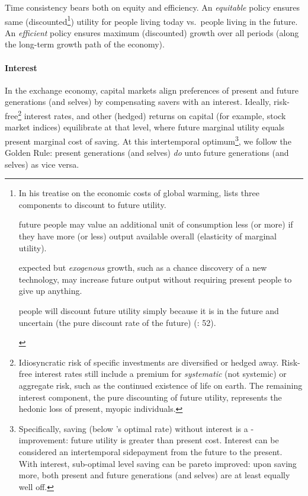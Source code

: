 Time consistency bears both on equity and efficiency. An \emph{equitable} policy ensures same (discounted\footnote{
	\label{fn:3components}In his treatise on the economic costs of global warming, \citeauthor{Stern-2006-aa} lists three components to discount to future utility. \begin{inparaenum}[\itshape 1\upshape)]
		\item future people may value an additional unit of consumption less (or more) if they have more (or less) output available overall (elasticity of marginal utility).
		\item expected but \emph{exogenous} growth, such as a chance discovery of a new technology, may increase future output without requiring present people to give up anything.
		\item people will discount future utility simply because it is in the future and uncertain (the pure discount rate of the future) (\citeyear{Stern-2006-aa}: 52).
	\end{inparaenum}})
utility for people living today vs.\ people living in the future. An \emph{efficient} policy ensures maximum (discounted) growth over all periods (along the long-term growth path of the economy). %


\paragraph{Interest}  \label{sec:interest} In the exchange economy, capital markets align preferences of present and future generations (and selves) by compensating savers with an interest. Ideally, risk-free\footnote{
	Idiosyncratic risk of specific investments are diversified or hedged away. Risk-free interest rates still include a premium for \emph{systematic} (not systemic) or aggregate risk, such as the continued existence of life on earth. The remaining interest component, the pure discounting of future utility, represents the hedonic loss of present, myopic individuals.}
interest rates, and other (hedged) returns on capital (for example, stock market indices) equilibrate at that level, where future marginal utility equals present marginal cost of saving. At this intertemporal optimum\footnote{
	Specifically, saving (below \citeauthor{Solow1956}'s optimal rate) without interest is a \citeauthor{Kaldor1939}-\citeauthor{Hicks1939} improvement: future utility is greater than present cost.
	Interest can be considered an intertemporal sidepayment from the future to the present.
	With interest, sub-optimal level saving can be pareto improved: upon saving more, both present and future generations (and selves) are at least equally well off.},
we follow the Golden Rule: present generations (and selves) \emph{do} unto future generations (and selves) as vice versa.

